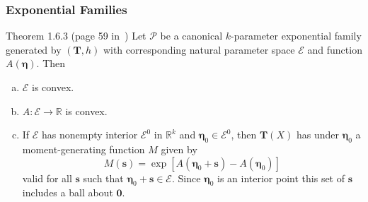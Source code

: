 \documentclass[serif,mathserif,professionalfont]{beamer}
\begin{document}
\begin{frame}
	
	\frametitle{Exponential Families}
	
	\begin{block}{Theorem 1.6.3 (page 59 in~\cite{BD2015})}
		Let $ \mathcal{P} $ be a canonical $k$-parameter exponential family generated by $ (\bm{T}, h) $ with corresponding natural parameter space $ \mathcal{E} $ and function $ A(\boldsymbol{\eta}) $. Then
		\begin{enumerate}[(a)]
			\item $ \mathcal{E} $ is convex.
			\item $ A: \mathcal{E} \rightarrow \mathbb{R} $ is convex.
			\item If $ \mathcal{E} $ has nonempty interior $ \mathcal{E}^0 $ in $ \mathbb{R}^k $ and $ \boldsymbol{\eta}_0 \in \mathcal{E}^0 $, then $ \bm{T}\left(X \right) $ has under $ \boldsymbol{\eta}_0 $ a moment-generating function $ M $ given by
			\begin{equation*}
			M\left(\bm{s} \right) = \exp \left[A\left(\boldsymbol{\eta}_0 + \bm{s} \right) - A\left(\boldsymbol{\eta}_0 \right) \right]
			\end{equation*} 
			valid for all $ \bm{s} $ such that $ \boldsymbol{\eta}_0 + \bm{s} \in \mathcal{E} $. Since $ \boldsymbol{\eta}_0 $ is an interior point this set of $ \bm{s} $ includes a ball about $ \bm{0} $.
		\end{enumerate}
	\end{block}
	
\end{frame}
\end{document}
